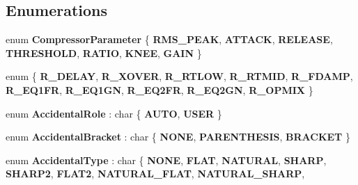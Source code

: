 \subsection*{Enumerations}
\begin{DoxyCompactItemize}
\item 
\mbox{\label{namespace_ms_a4d3abb48223aa297511c3100fd6ce4b9}} 
enum {\bfseries Compressor\+Parameter} \{ \newline
{\bfseries R\+M\+S\+\_\+\+P\+E\+AK}, 
{\bfseries A\+T\+T\+A\+CK}, 
{\bfseries R\+E\+L\+E\+A\+SE}, 
{\bfseries T\+H\+R\+E\+S\+H\+O\+LD}, 
\newline
{\bfseries R\+A\+T\+IO}, 
{\bfseries K\+N\+EE}, 
{\bfseries G\+A\+IN}
 \}
\item 
\mbox{\label{namespace_ms_a5388667586001e845380d0f937ec3a09}} 
enum \{ \newline
{\bfseries R\+\_\+\+D\+E\+L\+AY}, 
{\bfseries R\+\_\+\+X\+O\+V\+ER}, 
{\bfseries R\+\_\+\+R\+T\+L\+OW}, 
{\bfseries R\+\_\+\+R\+T\+M\+ID}, 
\newline
{\bfseries R\+\_\+\+F\+D\+A\+MP}, 
{\bfseries R\+\_\+\+E\+Q1\+FR}, 
{\bfseries R\+\_\+\+E\+Q1\+GN}, 
{\bfseries R\+\_\+\+E\+Q2\+FR}, 
\newline
{\bfseries R\+\_\+\+E\+Q2\+GN}, 
{\bfseries R\+\_\+\+O\+P\+M\+IX}
 \}
\item 
\mbox{\label{namespace_ms_a55c58e0e93a543f7ad29ebe885051671}} 
enum {\bfseries Accidental\+Role} \+: char \{ {\bfseries A\+U\+TO}, 
{\bfseries U\+S\+ER}
 \}
\item 
\mbox{\label{namespace_ms_ad645340ae3d26d22eb29ecc4395824a0}} 
enum {\bfseries Accidental\+Bracket} \+: char \{ {\bfseries N\+O\+NE}, 
{\bfseries P\+A\+R\+E\+N\+T\+H\+E\+S\+IS}, 
{\bfseries B\+R\+A\+C\+K\+ET}
 \}
\item 
\mbox{\label{namespace_ms_a5bbe555ac1f35336598cd0f82a8075d4}} 
enum {\bfseries Accidental\+Type} \+: char \{ \newline
{\bfseries N\+O\+NE}, 
{\bfseries F\+L\+AT}, 
{\bfseries N\+A\+T\+U\+R\+AL}, 
{\bfseries S\+H\+A\+RP}, 
\newline
{\bfseries S\+H\+A\+R\+P2}, 
{\bfseries F\+L\+A\+T2}, 
{\bfseries N\+A\+T\+U\+R\+A\+L\+\_\+\+F\+L\+AT}, 
{\bfseries N\+A\+T\+U\+R\+A\+L\+\_\+\+S\+H\+A\+RP}, 

\end{DoxyCompactItemize}
